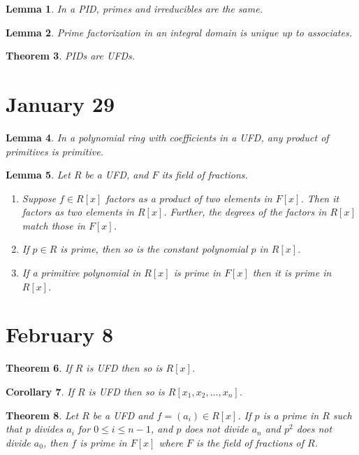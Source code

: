 \documentclass[letterpaper]{article}
\newtheorem{theorem}{Theorem}[section]
\newtheorem{lemma}[theorem]{Lemma}
\newtheorem{corollary}[theorem]{Corollary}
\begin{document}
\begin{lemma}
In a PID, primes and irreducibles are the same.
\end{lemma}

\begin{lemma}
Prime factorization in an integral domain is unique up to associates.
\end{lemma}

\begin{theorem}
PIDs are UFDs.
\end{theorem}

\section{January 29}

\begin{lemma}
\label{prim}
In a polynomial ring with coefficients in a UFD, any product of primitives is primitive.
\end{lemma}

\begin{lemma}
Let $R$ be a UFD, and $F$ its field of fractions.
\begin{enumerate}
\item Suppose $f \in R[x]$ factors as a product of two elements in $F[x]$. Then it factors as two  elements in $R[x]$. Further, the degrees of the factors in $R[x]$ match those in $F[x]$.
\item If $p \in R$ is prime, then so is the constant polynomial $p$ in $R[x]$.
\item If a primitive polynomial in $R[x]$ is prime in $F[x]$ then it is prime in $R[x]$.
\end{enumerate}
\end{lemma}


\section{February 8}

\begin{theorem}
If $R$ is UFD then so is $R[x]$.
\end{theorem}

\begin{corollary}
If $R$ is UFD then so is $R[x_1, x_2, \ldots, x_n]$.
\end{corollary}

\begin{theorem}
Let $R$ be a UFD and $f = (a_i) \in R[x]$. If $p$ is a prime in $R$ such that $p$ divides $a_i$ for $0 \leq i \leq n-1$, and $p$ does not divide $a_n$ and $p^2$ does not divide $a_0$, then $f$ is prime in $F[x]$ where $F$ is the field of fractions of $R$.
\end{theorem}
\end{document}
